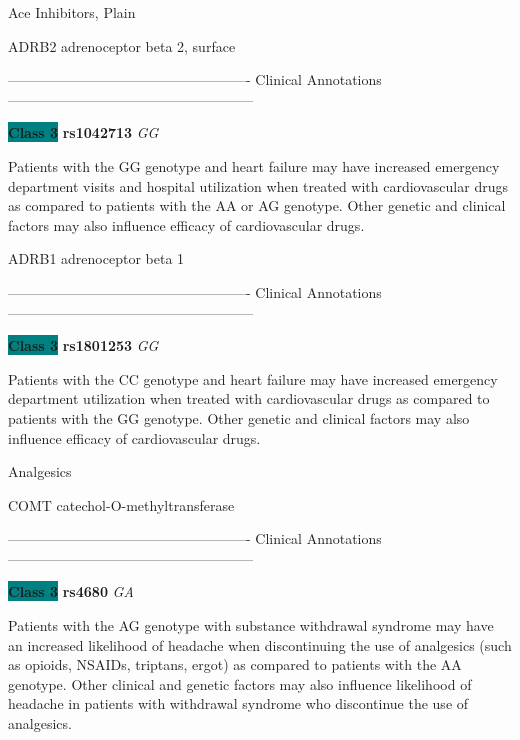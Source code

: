 \documentclass{resume} %
\begin{document}
\begin{rSection}{ Ace Inhibitors, Plain }
\item[]

\begin{rSubsection}{ ADRB2 }{ adrenoceptor beta 2, surface }{}{}
\item[]

\item[] ---------------------------------------------------- Clinical Annotations -----------------------------------------------------\newline
\item \textbf{\colorbox{teal} {Class 3}} \textbf{ rs1042713 } \textit{ GG }
\item[] Patients with the GG genotype and heart failure may have increased emergency department visits and hospital utilization when treated with cardiovascular drugs as compared to patients with the AA or AG genotype. Other genetic and clinical factors may also influence efficacy of cardiovascular drugs.
\end{rSubsection}\begin{rSubsection}{ ADRB1 }{ adrenoceptor beta 1 }{}{}
\item[]

\item[] ---------------------------------------------------- Clinical Annotations -----------------------------------------------------\newline
\item \textbf{\colorbox{teal} {Class 3}} \textbf{ rs1801253 } \textit{ GG }
\item[] Patients with the CC genotype and heart failure may have increased emergency department utilization when treated with cardiovascular drugs as compared to patients with the GG genotype. Other genetic and clinical factors may also influence efficacy of cardiovascular drugs.
\end{rSubsection}

\end{rSection}\begin{rSection}{ Analgesics }
\item[]

\begin{rSubsection}{ COMT }{ catechol-O-methyltransferase }{}{}
\item[]

\item[] ---------------------------------------------------- Clinical Annotations -----------------------------------------------------\newline
\item \textbf{\colorbox{teal} {Class 3}} \textbf{ rs4680 } \textit{ GA }
\item[] Patients with the AG genotype with substance withdrawal syndrome may have an increased likelihood of headache when discontinuing the use of analgesics (such as opioids, NSAIDs, triptans, ergot) as compared to patients with the AA genotype. Other clinical and genetic factors may also influence likelihood of headache in patients with withdrawal syndrome who discontinue the use of analgesics.
\end{rSubsection}


\end{rSection}
\end{document}
